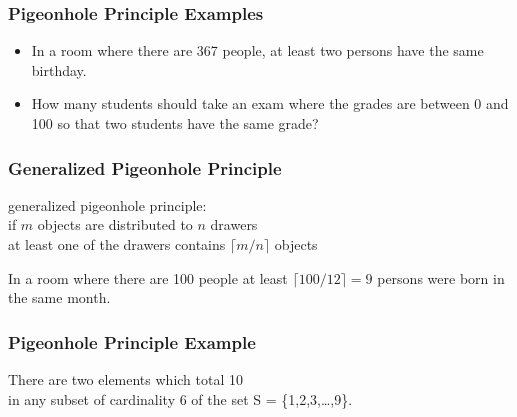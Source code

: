 \documentclass[dvipsnames]{beamer}
\begin{document}
\begin{frame}
  \frametitle{Pigeonhole Principle Examples}

  \begin{example}
    \begin{itemize}
      \item In a room where there are 367 people, at least two persons have the
        same birthday.

      \pause
      \item How many students should take an exam where the grades are between
        0 and 100 so that two students have the same grade?
    \end{itemize}
  \end{example}
\end{frame}

\begin{frame}
  \frametitle{Generalized Pigeonhole Principle}

  \begin{definition}
    \alert{generalized pigeonhole principle}:\\
    if $m$ objects are distributed to $n$ drawers\\
    at least one of the drawers contains $\lceil m / n \rceil$ objects
  \end{definition}

  \pause
  \begin{example}
    In a room where there are 100 people at least $\lceil 100 / 12 \rceil = 9$
    persons were born in the same month.
  \end{example}
\end{frame}

\begin{frame}
  \frametitle{Pigeonhole Principle Example}

  \begin{theorem}
    There are two elements which total 10\\
    in any subset of cardinality 6 of the set S = \{1,2,3,\dots,9\}.
  \end{theorem}
\end{frame}
\end{document}
